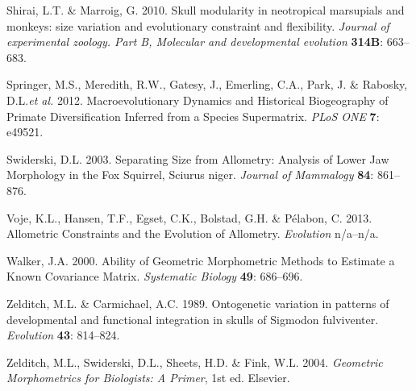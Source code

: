 \documentclass[12pt,]{article}
\begin{document}
Shirai, L.T. \& Marroig, G. 2010. Skull modularity in neotropical
marsupials and monkeys: size variation and evolutionary constraint and
flexibility. \emph{Journal of experimental zoology. Part B, Molecular
and developmental evolution} \textbf{314B}: 663--683.

Springer, M.S., Meredith, R.W., Gatesy, J., Emerling, C.A., Park, J. \&
Rabosky, D.L.\emph{et al.} 2012. Macroevolutionary Dynamics and
Historical Biogeography of Primate Diversification Inferred from a
Species Supermatrix. \emph{PLoS ONE} \textbf{7}: e49521.

Swiderski, D.L. 2003. Separating Size from Allometry: Analysis of Lower
Jaw Morphology in the Fox Squirrel, Sciurus niger. \emph{Journal of
Mammalogy} \textbf{84}: 861--876.

Voje, K.L., Hansen, T.F., Egset, C.K., Bolstad, G.H. \& Pélabon, C.
2013. Allometric Constraints and the Evolution of Allometry.
\emph{Evolution} n/a--n/a.

Walker, J.A. 2000. Ability of Geometric Morphometric Methods to Estimate
a Known Covariance Matrix. \emph{Systematic Biology} \textbf{49}:
686--696.

Zelditch, M.L. \& Carmichael, A.C. 1989. Ontogenetic variation in
patterns of developmental and functional integration in skulls of
Sigmodon fulviventer. \emph{Evolution} \textbf{43}: 814--824.

Zelditch, M.L., Swiderski, D.L., Sheets, H.D. \& Fink, W.L. 2004.
\emph{Geometric Morphometrics for Biologists: A Primer}, 1st ed.
Elsevier.
\end{document}
